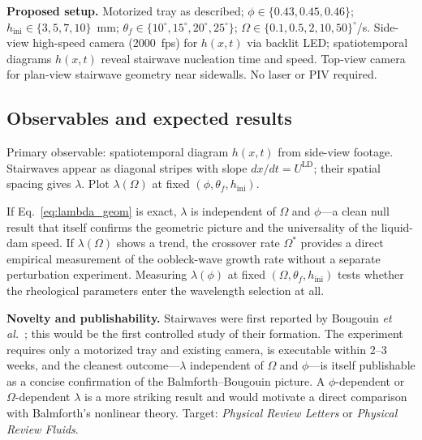 \documentclass[aps,preprint,superscriptaddress,longbibliography]{revtex4-2}
\newcommand{\ULD}{{U^{\mathrm{LD}}}}
\begin{document}
\begin{mdframed}[style=setupbox]
\textbf{Proposed setup.}
Motorized tray as described; $\phi \in \{0.43, 0.45, 0.46\}$;
$h_\text{ini} \in \{3, 5, 7, 10\}$~mm; $\theta_f \in \{10^\circ, 15^\circ,
20^\circ, 25^\circ\}$; $\Omega \in \{0.1, 0.5, 2, 10, 50\}^\circ$/s.
Side-view high-speed camera (2000~fps) for $h(x,t)$ via backlit LED; spatiotemporal
diagrams $h(x,t)$ reveal stairwave nucleation time and speed.
Top-view camera for plan-view stairwave geometry near sidewalls.
No laser or PIV required.
\end{mdframed}

\subsection{Observables and expected results}

Primary observable: spatiotemporal diagram $h(x,t)$ from side-view footage.
Stairwaves appear as diagonal stripes with slope $dx/dt = \ULD$; their spatial
spacing gives $\lambda$.  Plot $\lambda(\Omega)$ at fixed $(\phi, \theta_f,
h_\text{ini})$.

If Eq.~\eqref{eq:lambda_geom} is exact, $\lambda$ is independent of $\Omega$
and $\phi$---a clean null result that itself confirms the geometric picture and
the universality of the liquid-dam speed.  If $\lambda(\Omega)$ shows a trend,
the crossover rate $\Omega^*$ provides a direct empirical measurement of the
oobleck-wave growth rate without a separate perturbation experiment.  Measuring
$\lambda(\phi)$ at fixed $(\Omega, \theta_f, h_\text{ini})$ tests whether the
rheological parameters enter the wavelength selection at all.

\begin{mdframed}[style=noveltybox]
\textbf{Novelty and publishability.}
Stairwaves were first reported by Bougouin \textit{et al.}~\cite{Bougouin2026PRL};
this would be the first controlled study of their formation.  The experiment
requires only a motorized tray and existing camera, is executable within 2--3
weeks, and the cleanest outcome---$\lambda$ independent of $\Omega$ and $\phi$---is
itself publishable as a concise confirmation of the Balmforth--Bougouin picture.
A $\phi$-dependent or $\Omega$-dependent $\lambda$ is a more striking result and
would motivate a direct comparison with Balmforth's nonlinear theory.
Target: \textit{Physical Review Letters} or \textit{Physical Review Fluids}.
\end{mdframed}

\end{document}
